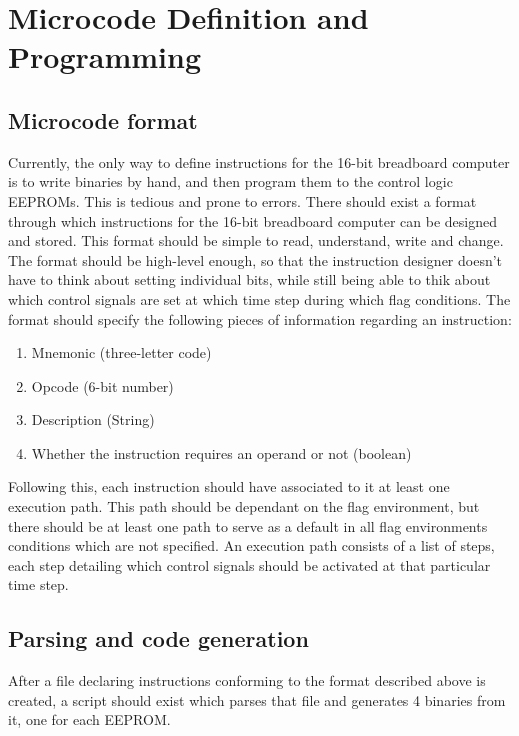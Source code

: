 \section{Microcode Definition and Programming}
\subsection{Microcode format}
Currently, the only way to define instructions for the 16-bit breadboard computer is to write
binaries by hand, and then program them to the control logic EEPROMs. This is tedious and
prone to errors. There should exist a format through which instructions for the 16-bit breadboard
computer can be designed and stored. This format should be simple to read, understand, write and
change. The format should be high-level enough, so that the instruction designer doesn't have to
think about setting individual bits, while still being able to thik about which control signals
are set at which time step during which flag conditions. The format should specify the following
pieces of information regarding an instruction:
\begin{enumerate}
  \item Mnemonic (three-letter code)
  \item Opcode (6-bit number)
  \item Description (String)
  \item Whether the instruction requires an operand or not (boolean)
\end{enumerate}
Following this, each instruction should have associated to it at least one execution path.
This path should be dependant on the flag environment, but there should be at least one path
to serve as a default in all flag environments conditions which are not specified. An execution
path consists of a list of steps, each step detailing which control signals should be activated
at that particular time step.

 \subsection{Parsing and code generation}
 After a file declaring instructions conforming to the format described above is created, a script
 should exist which parses that file and generates 4 binaries from it, one for each EEPROM.

